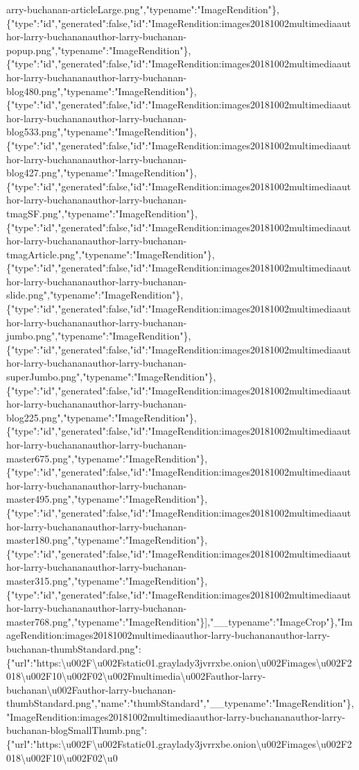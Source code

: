 arry-buchanan-articleLarge.png","typename":"ImageRendition"\},\{"type":"id","generated":false,"id":"ImageRendition:images20181002multimediaauthor-larry-buchananauthor-larry-buchanan-popup.png","typename":"ImageRendition"\},\{"type":"id","generated":false,"id":"ImageRendition:images20181002multimediaauthor-larry-buchananauthor-larry-buchanan-blog480.png","typename":"ImageRendition"\},\{"type":"id","generated":false,"id":"ImageRendition:images20181002multimediaauthor-larry-buchananauthor-larry-buchanan-blog533.png","typename":"ImageRendition"\},\{"type":"id","generated":false,"id":"ImageRendition:images20181002multimediaauthor-larry-buchananauthor-larry-buchanan-blog427.png","typename":"ImageRendition"\},\{"type":"id","generated":false,"id":"ImageRendition:images20181002multimediaauthor-larry-buchananauthor-larry-buchanan-tmagSF.png","typename":"ImageRendition"\},\{"type":"id","generated":false,"id":"ImageRendition:images20181002multimediaauthor-larry-buchananauthor-larry-buchanan-tmagArticle.png","typename":"ImageRendition"\},\{"type":"id","generated":false,"id":"ImageRendition:images20181002multimediaauthor-larry-buchananauthor-larry-buchanan-slide.png","typename":"ImageRendition"\},\{"type":"id","generated":false,"id":"ImageRendition:images20181002multimediaauthor-larry-buchananauthor-larry-buchanan-jumbo.png","typename":"ImageRendition"\},\{"type":"id","generated":false,"id":"ImageRendition:images20181002multimediaauthor-larry-buchananauthor-larry-buchanan-superJumbo.png","typename":"ImageRendition"\},\{"type":"id","generated":false,"id":"ImageRendition:images20181002multimediaauthor-larry-buchananauthor-larry-buchanan-blog225.png","typename":"ImageRendition"\},\{"type":"id","generated":false,"id":"ImageRendition:images20181002multimediaauthor-larry-buchananauthor-larry-buchanan-master675.png","typename":"ImageRendition"\},\{"type":"id","generated":false,"id":"ImageRendition:images20181002multimediaauthor-larry-buchananauthor-larry-buchanan-master495.png","typename":"ImageRendition"\},\{"type":"id","generated":false,"id":"ImageRendition:images20181002multimediaauthor-larry-buchananauthor-larry-buchanan-master180.png","typename":"ImageRendition"\},\{"type":"id","generated":false,"id":"ImageRendition:images20181002multimediaauthor-larry-buchananauthor-larry-buchanan-master315.png","typename":"ImageRendition"\},\{"type":"id","generated":false,"id":"ImageRendition:images20181002multimediaauthor-larry-buchananauthor-larry-buchanan-master768.png","typename":"ImageRendition"\}{]},"\_\_typename":"ImageCrop"\},"ImageRendition:images20181002multimediaauthor-larry-buchananauthor-larry-buchanan-thumbStandard.png":\{"url":"https:\textbackslash{}u002F\textbackslash{}u002Fstatic01.graylady3jvrrxbe.onion\textbackslash{}u002Fimages\textbackslash{}u002F2018\textbackslash{}u002F10\textbackslash{}u002F02\textbackslash{}u002Fmultimedia\textbackslash{}u002Fauthor-larry-buchanan\textbackslash{}u002Fauthor-larry-buchanan-thumbStandard.png","name":"thumbStandard","\_\_typename":"ImageRendition"\},"ImageRendition:images20181002multimediaauthor-larry-buchananauthor-larry-buchanan-blogSmallThumb.png":\{"url":"https:\textbackslash{}u002F\textbackslash{}u002Fstatic01.graylady3jvrrxbe.onion\textbackslash{}u002Fimages\textbackslash{}u002F2018\textbackslash{}u002F10\textbackslash{}u002F02\textbackslash{}u0